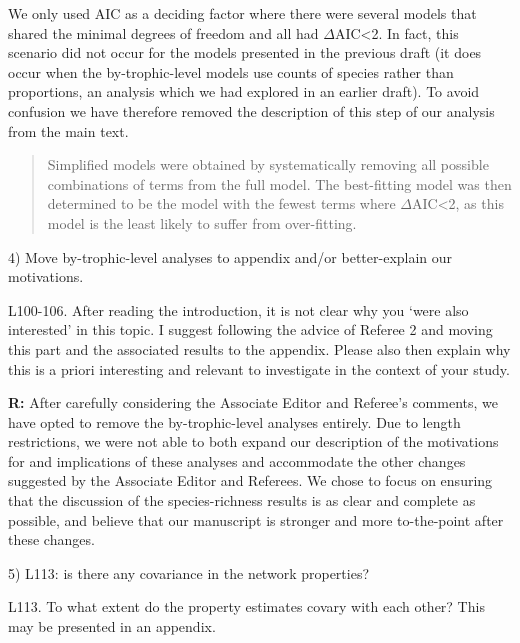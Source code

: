 \documentclass[12pt]{letter}
\newenvironment{refquote}{\bigskip \begin{it}}{\end{it}\smallskip}
\begin{document}
  We only used AIC as a deciding factor where
  there were several models that shared the minimal degrees 
  of freedom and all had $\Delta$AIC\textless2. In fact, 
  this scenario did not occur for the models presented in 
  the previous draft (it does occur when the 
  by-trophic-level models use counts of species rather than
  proportions, an analysis which we had explored in an 
  earlier draft). To avoid confusion we have therefore 
  removed the description of this step of our analysis from 
  the main text. 


  \begin{quotation}

    Simplified models were obtained by systematically 
    removing all possible combinations of terms from the 
    full model. The best-fitting model was then determined 
    to be the model with the fewest terms where 
    $\Delta$AIC\textless2, as this model is the least likely 
    to suffer from over-fitting. 

  \end{quotation}


  4) Move by-trophic-level analyses to appendix and/or better-explain our motivations.

  \begin{refquote}

    L100-106. After reading the introduction, it is not clear why you ‘were
    also interested’ in this topic. I suggest following the advice of Referee
    2 and moving this part and the associated results to the appendix. Please
    also then explain why this is a priori interesting and relevant to
    investigate in the context of your study.

  \end{refquote}

  \textbf{R:} After carefully considering the Associate 
  Editor and Referee's comments, we have opted to remove
  the by-trophic-level analyses entirely. Due to length
  restrictions, we were not able to both expand our 
  description of the motivations for and implications of
  these analyses and accommodate the other changes suggested
  by the Associate Editor and Referees. We chose to focus
  on ensuring that the discussion of the species-richness
  results is as clear and complete as possible, and believe
  that our manuscript is stronger and more to-the-point
  after these changes. 


  5) L113: is there any covariance in the network properties?

  \begin{refquote}

    L113. To what extent do the property estimates covary with each other?
    This may be presented in an appendix.

  \end{refquote}
\end{document}
